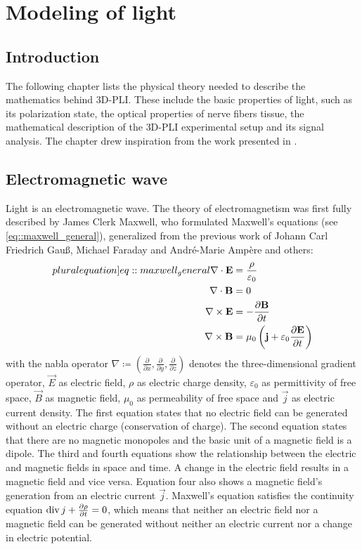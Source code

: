 \cleardoublepage
\setcounter{chapter}{2}
\chapter{Modeling of light}
\label{sec:theory}
%
\section{Introduction}
The following chapter lists the physical theory needed to describe the mathematics behind \ac{3D-PLI}.
These include the basic properties of light, such as its polarization state, the optical properties of nerve fibers tissue, the mathematical description of the \ac{3D-PLI} experimental setup and its signal analysis.
The chapter drew inspiration from the work presented in \cite{demtroeder2, Fliebach2012}.
%
%
%
\section{Electromagnetic wave}
%
Light is an electromagnetic wave.
The theory of electromagnetism was first fully described by James Clerk Maxwell, who formulated Maxwell's equations (see \cref{eq::maxwell_general}), generalized from the previous work of Johann Carl Friedrich Gau{\ss}, Michael Faraday and Andr\'{e}-Marie Amp\`{e}re and others:
%
\begin{align}
\begin{split} \label[pluralequation]{eq::maxwell_general}
    \nabla \cdot \vec{E} &= \frac {\rho} {\varepsilon_0}\\
    \nabla \cdot \vec{B} &= 0\\
    \nabla \times \vec{E} &= -\frac{\partial \vec{B}} {\partial t}\\
    \nabla \times \vec{B} &= \mu_0 \left( \vec{j} + \varepsilon_0 \frac{\partial \vec{E}} {\partial t} \right)
\end{split}
\end{align}
%
with the nabla operator $\nabla \coloneqq \left({\frac{\partial}{\partial x}}, {\frac{\partial}{\partial y}}, {\frac{\partial}{\partial z}} \right)$ denotes the three-dimensional gradient operator, $\vec{E}$ as electric field, $\rho$ as electric charge density, $\varepsilon_0$ as permittivity of free space, $\vec{B}$ as magnetic field, $\mu_0$ as permeability of free space and $\vec{j}$ as electric current density.
%
The first equation states that no electric field can be generated without an electric charge (conservation of charge).
The second equation states that there are no magnetic monopoles and the basic unit of a magnetic field is a dipole.
The third and fourth equations show the relationship between the electric and magnetic fields in space and time.
A change in the electric field results in a magnetic field and vice versa.
Equation four also shows a magnetic field's generation from an electric current $\vec{j}$.
Maxwell's equation satisfies the continuity equation $\operatorname{div} j + \frac{\partial \rho}{\partial t} = 0$, which means that neither an electric field nor a magnetic field can be generated without neither an electric current nor a change in electric potential.
%
%
